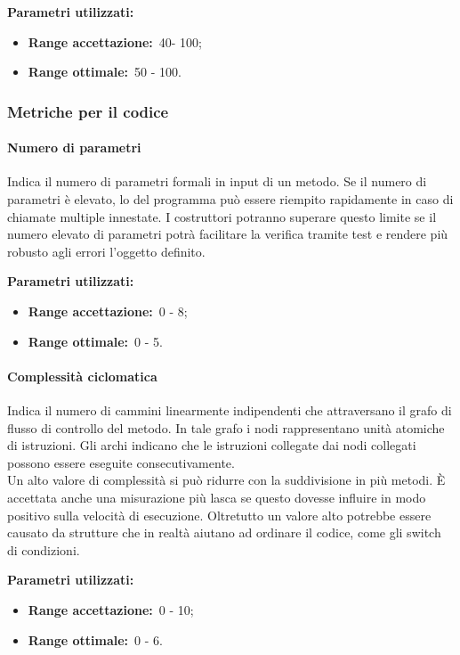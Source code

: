				\textbf{Parametri utilizzati:}
				\begin{itemize}
					\item \textbf{Range accettazione:}\ 40- 100;
					\item \textbf{Range ottimale:}\ 50 - 100.
				\end{itemize}
		\subsubsection{Metriche per il codice}		
			\label{sec:3.9.3}
			\paragraph{Numero di parametri}
				\label{sec:3.9.3.1}
				Indica il numero di parametri formali in input di un metodo. Se il numero di parametri è elevato, lo  del programma può essere riempito rapidamente in caso di chiamate multiple innestate. I costruttori potranno superare questo limite se il numero elevato di parametri potrà facilitare la verifica tramite test e rendere più robusto agli errori l'oggetto definito.
				
				\textbf{Parametri utilizzati:}
				\begin{itemize}
					\item \textbf{Range accettazione:}\ 0 - 8;
					\item \textbf{Range ottimale:}\ 0 - 5.
				\end{itemize}
			\paragraph{Complessità ciclomatica}
				\label{sec:3.9.3.2}
				Indica il numero di cammini linearmente indipendenti che attraversano il grafo di flusso di controllo del metodo. In tale grafo i nodi rappresentano unità atomiche di istruzioni. Gli archi indicano che le istruzioni collegate dai nodi collegati possono essere eseguite consecutivamente. \\
				Un alto valore di complessità si può ridurre con la suddivisione in più metodi. È accettata anche una misurazione più lasca se questo dovesse influire in modo positivo sulla velocità di esecuzione. Oltretutto un valore alto potrebbe essere causato da strutture che in realtà aiutano ad ordinare il codice, come gli switch di condizioni.
				
				\textbf{Parametri utilizzati:}
				\begin{itemize}
					\item \textbf{Range accettazione:}\ 0 - 10;
					\item \textbf{Range ottimale:}\ 0 - 6.
				\end{itemize}
